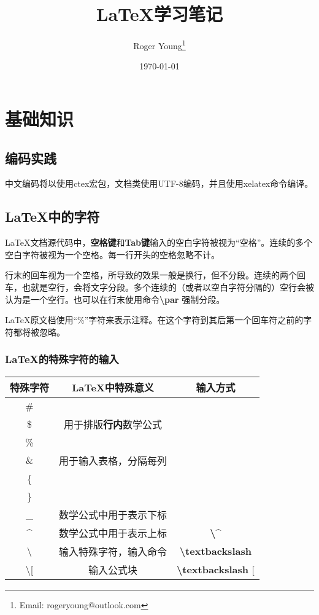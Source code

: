 \documentclass[utf8]{book}
\title{\LaTeX 学习笔记}
\author{Roger Young\thanks{Email: rogeryoung@outlook.com}}
\date{\today}
\newcommand{\latexcommand}[1]{\textbf{\textbackslash #1}}
\begin{document}
	\maketitle
	
	\frontmatter
	
	\tableofcontents
	
	\mainmatter
	
	\chapter{基础知识}
	\section{编码实践}
	中文编码将以使用ctex宏包，文档类使用UTF-8编码，并且使用xelatex命令编译。
	\section{\LaTeX 中的字符}
	\LaTeX 文档源代码中，\textbf{空格键}和\textbf{Tab键}输入的空白字符被视为“空格”。连续的多个空白字符被视为一个空格。每一行开头的空格忽略不计。
	
	行末的回车视为一个空格，所导致的效果一般是换行，但不分段。连续的两个回车，也就是空行，会将文字分段。多个连续的（或者以空白字符分隔的）空行会被认为是一个空行。也可以在行末使用命令\latexcommand{par} 强制分段。
	
	\LaTeX 原文档使用“\%”字符来表示注释。在这个字符到其后第一个回车符之前的字符都将被忽略。
	
	\subsection{\LaTeX 的特殊字符的输入}
	\begin{tabular}{|c|c|c|}
		\hline
		特殊字符 & \LaTeX 中特殊意义 & 输入方式 \\
		\hline
		\# &  & \\
		\hline
		\$ & 用于排版\textbf{行内}数学公式 & \\
		\hline
		\% & & \\
		\hline
		\& & 用于输入表格，分隔每列 & \\
		\hline
		\{ & & \\
		\hline
		\}& & \\
		\hline
		\_ & 数学公式中用于表示下标 &  \\
		\hline
		\^ & 数学公式中用于表示上标 & \latexcommand{\^} \\
		\hline
		\textbackslash  & 输入特殊字符，输入命令 & \latexcommand{textbackslash} \\
		\hline
		\textbackslash [  & 输入公式块 & \latexcommand{textbackslash} [ \\
		\hline
	\end{tabular}
	
\end{document}
